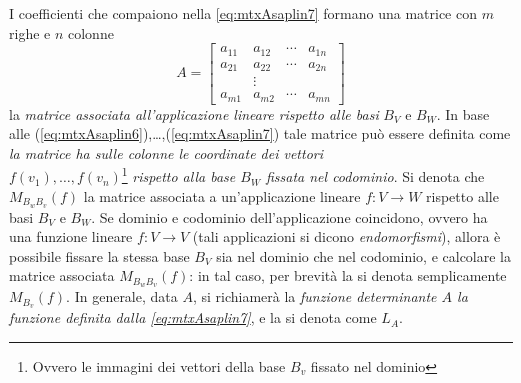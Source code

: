 I coefficienti che compaiono nella \ref{eq:mtxAsaplin7} formano una
matrice con $m$ righe e $n$ colonne
\begin{equation*}
  A=
  \begin{bmatrix}
    a_{11} & a_{12} & \cdots & a_{1n}\\
    a_{21} & a_{22} & \cdots & a_{2n}\\
           & \vdots\\
    a_{m1} & a_{m2} & \cdots & a_{mn}
  \end{bmatrix}
\end{equation*}
la \emph{matrice associata all'applicazione lineare rispetto alle basi}
$B_V$ e $B_W$. In base alle
(\ref{eq:mtxAsaplin6}),\dots,(\ref{eq:mtxAsaplin7}) tale matrice può
essere definita come \emph{la matrice ha sulle colonne le coordinate dei
  vettori\\ $f(v_1),\dots,f(v_n)$}\footnote{Ovvero le immagini dei vettori
  della base $B_v$ fissato nel dominio} \emph{rispetto alla base $B_W$
  fissata nel codominio}. Si denota che $M_{B_w B_v}(f)$ la matrice
associata a un'applicazione lineare $f:V\to W$ rispetto alle basi $B_V$
e $B_W$. Se dominio e codominio dell'applicazione coincidono, ovvero ha
una funzione lineare $f:V\to V$ (tali applicazioni si dicono
\emph{endomorfismi}), allora è possibile fissare la stessa base $B_V$
sia nel dominio che nel codominio, e calcolare la matrice associata
$M_{B_w B_v} (f)$: in tal caso, per brevità la si denota semplicamente
$M_{B_v} (f)$. In generale, data $A$, si richiamerà la \emph{funzione
  determinante $A$ la funzione definita dalla \ref{eq:mtxAsaplin7}}, e
la si denota come $L_A$.

